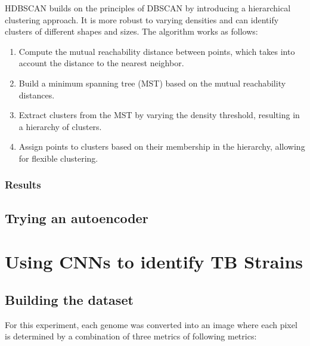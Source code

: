 \label{subsubsec:hdbscan}

HDBSCAN builds on the principles of DBSCAN by introducing a hierarchical clustering approach. It is more robust to varying
densities and can identify clusters of different shapes and sizes. The algorithm works as follows:

\begin{enumerate}
	\item Compute the mutual reachability distance between points, which takes into account the distance to the nearest neighbor.
	\item Build a minimum spanning tree (MST) based on the mutual reachability distances.
	\item Extract clusters from the MST by varying the density threshold, resulting in a hierarchy of clusters.
	\item Assign points to clusters based on their membership in the hierarchy, allowing for flexible clustering.
\end{enumerate}

\subsection{Results}
\label{subsec:results_dbscan_hdbscan}

\section{Trying an autoencoder}
\label{sec:autoencoder}

\chapter{Using CNNs to identify TB Strains}
\label{chap:cnn_tb_strains}

\section{Building the dataset}
\label{sec:building_dataset}

For this experiment, each genome was converted into an image where each pixel is determined by a combination of three metrics of
following metrics:

